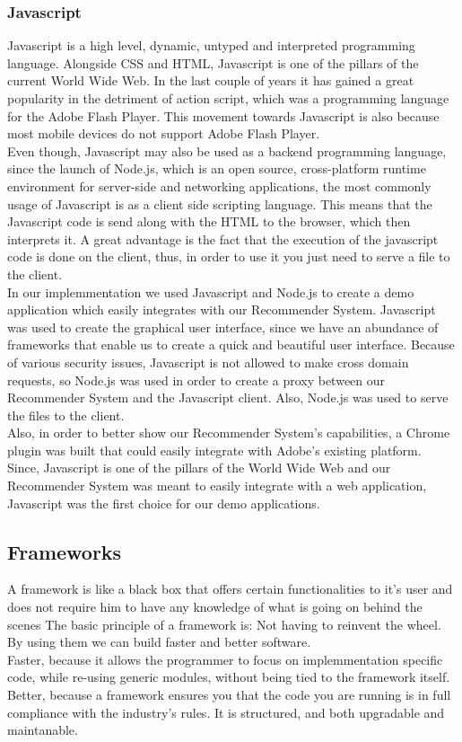 \subsubsection{Javascript}
\label{sec:programming-languages-javascript}
Javascript is a high level, dynamic, untyped and interpreted programming language. Alongside CSS and HTML, Javascript is one of the pillars of the current World Wide Web. In the last couple of years it has gained a great popularity in the detriment of action script, which was a programming language for the Adobe Flash Player. This movement towards Javascript is also because most mobile devices do not support Adobe Flash Player.
\\ Even though, Javascript may also be used as a backend programming language, since the launch of Node.js, which is  an open source, cross-platform runtime environment for server-side and networking applications, the most commonly usage of Javascript is as a client side scripting language. This means that the Javascript code is send along with the HTML to the browser, which then interprets it. A great advantage is the fact that the execution of the javascript code is done on the client, thus, in order to use it you just need to serve a file to the client.
\\ In our implemmentation we used Javascript and Node.js to create a demo application which easily integrates with our Recommender System. Javascript was used to create the graphical user interface, since we have an abundance of frameworks that enable us to create a quick and beautiful user interface. Because of various security issues, Javascript is not allowed to make cross domain requests, so Node.js was used in order to create a proxy between our Recommender System and the Javascript client. Also, Node.js was used to serve the files to the client.
\\ Also, in order to better show our Recommender System's capabilities, a Chrome plugin was built that could easily integrate with Adobe's existing platform.
\\ Since, Javascript is one of the pillars of the World Wide Web and our Recommender System was meant to easily integrate with a web application, Javascript was the first choice for our demo applications.


\subsection{Frameworks}
\label{sec:frameworks}
A framework is like a black box that offers certain functionalities to it's user and does not require him to have any knowledge of what is going on behind the scenes
The basic principle of a framework is: Not having to reinvent the wheel. By using them we can build faster and better software.
\\ Faster, because it allows the programmer to focus on implemmentation specific code, while re-using generic modules, without being tied to the framework itself.
\\ Better, because a framework ensures you that the code you are running is in full compliance with the industry's rules. It is structured, and both upgradable and maintanable.

